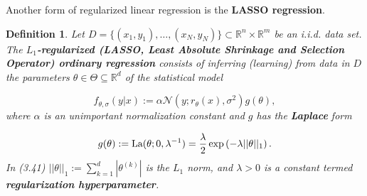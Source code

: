 \documentclass{report}
\newtheorem{definition}{Definition}[chapter]
\begin{document}
Another form of regularized linear regression is the \textbf{LASSO regression}.

\begin{definition}
Let $D = \{(x_1,y_1),\dots,(x_N,y_N)\} \subset \mathbb{R}^n \times \mathbb{R}^m$ be an i.i.d. data set. The \textbf{$L_1$-regularized (LASSO, Least Absolute Shrinkage and Selection Operator) ordinary regression} consists of inferring (learning) from data in $D$ the parameters $\theta \in \Theta \subseteq \mathbb{R}^d$ of the statistical model

\begin{equation}
f_{\theta,\sigma}(y|x) := \alpha\mathcal{N}(y;r_\theta(x),\sigma^2)g(\theta),
\end{equation}
where $\alpha$ is an unimportant normalization constant and $g$ has the \textbf{Laplace} form

\begin{equation}
g(\theta) := \textup{La}(\theta;0,\lambda^{-1}) = \frac{\lambda}{2}\exp\left(-\lambda||\theta||_1\right).
\end{equation}
In (3.41) $||\theta||_1 := \sum_{k=1}^d |\theta^{(k)}|$ is the $L_1$ norm, and $\lambda > 0$ is a constant termed \textbf{regularization hyperparameter}.
\end{definition}
\end{document}
